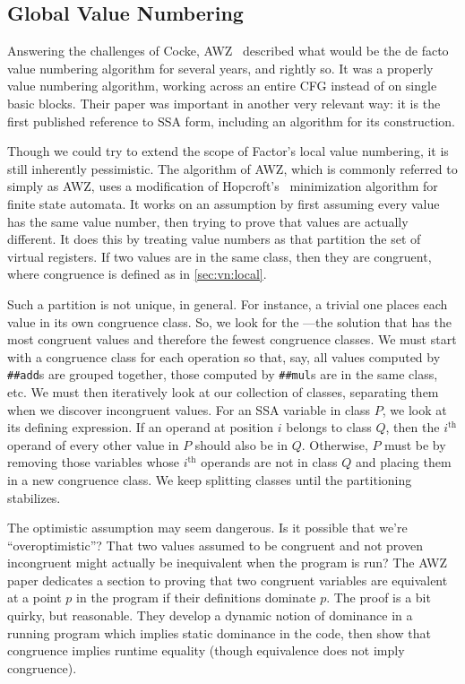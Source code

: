 \subsection{Global Value Numbering}\label{sec:vn:global}

Answering the challenges of Cocke, AWZ~
described what would be the de facto value numbering algorithm for several
years, and rightly so.  It was a properly  value numbering
algorithm, working across an entire \gls{CFG} instead of on single basic
blocks.  Their paper was important in another very relevant way: it is the
first published reference to SSA form, including an
algorithm for its construction.

Though we could try to extend the scope of Factor's local value numbering, it
is still inherently pessimistic.  The algorithm of AWZ, which
is commonly referred to simply as AWZ, uses a modification of
Hopcroft's~ minimization algorithm for finite state automata.
It works on an  assumption by first assuming every value has
the same value number, then trying to prove that values are actually different.
It does this by treating value numbers as  that
partition the set of virtual registers.  If two values are in the same class,
then they are congruent, where congruence is defined as in \cref{sec:vn:local}.

Such a partition is not unique, in general.  For instance, a trivial one places
each value in its own congruence class.  So, we look for the ---the solution that has the most congruent values and therefore
the fewest congruence classes.  We must start with a congruence class for each
operation so that, say, all values computed by \Verb|##add|s are grouped
together, those computed by \Verb|##mul|s are in the same class, etc.  We
must then iteratively look at our collection of classes, separating them when
we discover incongruent values.  For an \gls{SSA} variable in class $P$, we
look at its defining expression.  If an operand at position $i$ belongs to
class $Q$, then the $i^\text{th}$ operand of every other value in $P$ should
also be in $Q$.  Otherwise, $P$ must be  by removing those
variables whose $i^\text{th}$ operands are not in class $Q$ and placing them in
a new congruence class.  We keep splitting classes until the partitioning
stabilizes.

The optimistic assumption may seem dangerous.  Is it possible that we're
``overoptimistic''?  That two values assumed to be congruent and not proven
incongruent might actually be inequivalent when the program is run?  The
AWZ~ paper dedicates a section to proving that two congruent
variables are equivalent at a point $p$ in the program if their definitions
dominate $p$.  The proof is a bit quirky, but reasonable.  They develop a
dynamic notion of dominance in a running program which implies static dominance
in the code, then show that congruence implies runtime equality (though
equivalence does not imply congruence).

